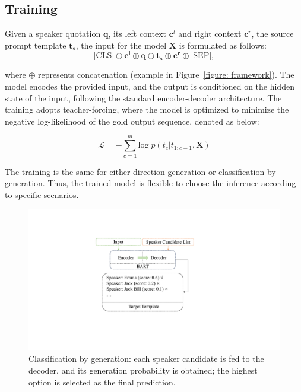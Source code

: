 \documentclass[letterpaper]{article} %
\begin{document}
\subsection{Training}

Given a speaker quotation $\mathbf{q}$, its left context $\mathbf{c}^{l}$ and right context $\mathbf{c}^{r}$, the source prompt template $\mathbf{t_s}$, the input for the model $\mathbf{X}$ is formulated as follows:
\begin{equation}
        \text{[CLS]} \oplus \mathbf{c^l} \oplus \mathbf{q} \oplus \mathbf{t_{s}} \oplus \mathbf{c^r} \oplus \text{[SEP]}, %
\end{equation}

where $\oplus$ represents concatenation (example in Figure~\ref{figure: framework}).
The model encodes the provided input, and the output is conditioned on the hidden state of the input, following the standard encoder-decoder architecture.
The training adopts teacher-forcing, where the model is optimized to minimize the negative log-likelihood of the gold output sequence, denoted as below:

\begin{equation}
    \mathcal{L} = - \sum_{c=1}^{m} \mathrm{log}\; p(t_{c}|t_{1:c-1},\mathbf{X}) 
\end{equation}

The training is the same for either direction generation or classification by generation. Thus, the trained model is flexible to choose the inference according to specific scenarios.

\begin{figure}[th]
\centering
\includegraphics[width=0.65\columnwidth]{cls.pdf}
\caption{Classification by generation: each speaker candidate is fed to the decoder, and its generation probability is obtained; the highest option is selected as the final prediction.}
\label{figure: score}
\end{figure}
\end{document}
